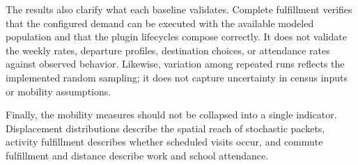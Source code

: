 The results also clarify what each baseline validates. Complete fulfillment verifies that the configured demand can be executed with the available modeled population and that the plugin lifecycles compose correctly. It does not validate the weekly rates, departure profiles, destination choices, or attendance rates against observed behavior. Likewise, variation among repeated runs reflects the implemented random sampling; it does not capture uncertainty in census inputs or mobility assumptions.

Finally, the mobility measures should not be collapsed into a single indicator. Displacement distributions describe the spatial reach of stochastic packets, %
activity fulfillment describes whether scheduled visits occur, and commute fulfillment and distance describe work and school attendance.
